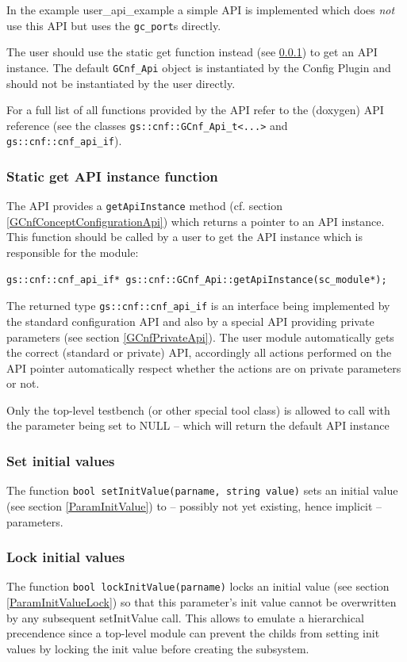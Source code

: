 In the example \textsf{user\_api\_example} a simple API is implemented which does {\em not} use this API but uses the \lstinline|gc_port|s directly.

The user should use the  static get function instead (see \ref{StaticGetAPIinstance}) to get an API instance. The default \lstinline|GCnf_Api| object is instantiated by the Config Plugin and should not be instantiated by the user directly.

For a full list of all functions provided by the \GreenConfig API refer to the (doxygen) API reference (see the classes \lstinline|gs::cnf::GCnf_Api_t<...>| and \lstinline|gs::cnf::cnf_api_if|).

\subsubsection{Static get API instance function}
\label{StaticGetAPIinstance}
The \GreenConfig API provides a \lstinline|getApiInstance| method (cf. section \ref{GCnfConceptConfigurationApi}) which returns a pointer to an API instance. This function should be called by a user to get the API instance which is responsible for the module:

\begin{lstlisting}
gs::cnf::cnf_api_if* gs::cnf::GCnf_Api::getApiInstance(sc_module*);
\end{lstlisting}

The returned type \lstinline|gs::cnf::cnf_api_if| is an interface being implemented by the standard configuration API and also by a special API providing private parameters (see section \ref{GCnfPrivateApi}). The user module automatically gets the correct (standard or private) API, accordingly all actions performed on the API pointer automatically respect whether the actions are on private parameters or not.

Only the top-level testbench (or other special tool class) is allowed to call with the parameter being set to NULL -- which will return the default API instance

\subsubsection{Set initial values}
The function \lstinline|bool setInitValue(parname, string value)| sets an initial value (see section \ref{ParamInitValue}) to -- possibly not yet existing, hence implicit -- parameters.

\subsubsection{Lock initial values}
The function \lstinline|bool lockInitValue(parname)| locks an initial value (see section \ref{ParamInitValueLock}) so that this parameter's init value cannot be overwritten by
    any subsequent setInitValue call. This allows to emulate a hierarchical
    precendence since a top-level module can prevent the childs from setting
    init values by locking the init value before creating the subsystem.
   
